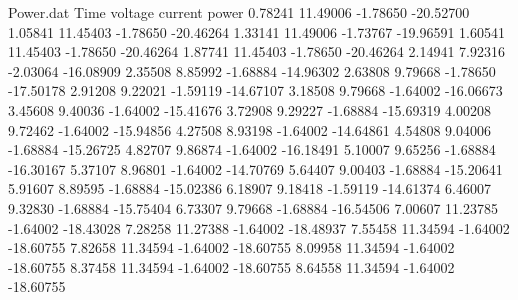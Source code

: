 \begin{filecontents}{Power.dat}
Time voltage current power
   0.78241   11.49006   -1.78650  -20.52700
   1.05841   11.45403   -1.78650  -20.46264
   1.33141   11.49006   -1.73767  -19.96591
   1.60541   11.45403   -1.78650  -20.46264
   1.87741   11.45403   -1.78650  -20.46264
   2.14941    7.92316   -2.03064  -16.08909
   2.35508    8.85992   -1.68884  -14.96302
   2.63808    9.79668   -1.78650  -17.50178
   2.91208    9.22021   -1.59119  -14.67107
   3.18508    9.79668   -1.64002  -16.06673
   3.45608    9.40036   -1.64002  -15.41676
   3.72908    9.29227   -1.68884  -15.69319
   4.00208    9.72462   -1.64002  -15.94856
   4.27508    8.93198   -1.64002  -14.64861
   4.54808    9.04006   -1.68884  -15.26725
   4.82707    9.86874   -1.64002  -16.18491
   5.10007    9.65256   -1.68884  -16.30167
   5.37107    8.96801   -1.64002  -14.70769
   5.64407    9.00403   -1.68884  -15.20641
   5.91607    8.89595   -1.68884  -15.02386
   6.18907    9.18418   -1.59119  -14.61374
   6.46007    9.32830   -1.68884  -15.75404
   6.73307    9.79668   -1.68884  -16.54506
   7.00607   11.23785   -1.64002  -18.43028
   7.28258   11.27388   -1.64002  -18.48937
   7.55458   11.34594   -1.64002  -18.60755
   7.82658   11.34594   -1.64002  -18.60755
   8.09958   11.34594   -1.64002  -18.60755
   8.37458   11.34594   -1.64002  -18.60755
   8.64558   11.34594   -1.64002  -18.60755
\end{filecontents}
